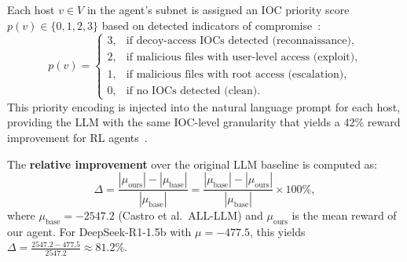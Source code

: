 
Each host $v \in V$ in the agent's subnet is assigned
an IOC priority score $p(v) \in \{0,1,2,3\}$ based on
detected indicators of compromise~\cite{arXiv:2410.17351}:
\begin{equation}
\label{eq:ioc_priority}
  p(v) =
  \begin{cases}
    3, & \text{if decoy-access IOCs detected (reconnaissance)}, \\
    2, & \text{if malicious files with user-level access (exploit)}, \\
    1, & \text{if malicious files with root access (escalation)}, \\
    0, & \text{if no IOCs detected (clean)}.
  \end{cases}
\end{equation}
This priority encoding is injected into the natural language
prompt for each host, providing the LLM with the same
IOC-level granularity that yields a 42\% reward improvement
for RL agents~\cite{arXiv:2410.17351}.


%


The \textbf{relative improvement} over the original LLM baseline
is computed as:
\begin{equation}
\label{eq:improvement}
  \Delta = \frac{|\mu_{\text{ours}}| - |\mu_{\text{base}}|}{|\mu_{\text{base}}|}
         = \frac{|\mu_{\text{base}}| - |\mu_{\text{ours}}|}{|\mu_{\text{base}}|}
         \times 100\%,
\end{equation}
where $\mu_{\text{base}} = -2547.2$ (Castro et al.\ ALL-LLM)
and $\mu_{\text{ours}}$ is the mean reward of our agent.
For DeepSeek-R1-1.5b with $\mu=-477.5$, this yields
$\Delta = \frac{2547.2 - 477.5}{2547.2} \approx 81.2\%$.


%

